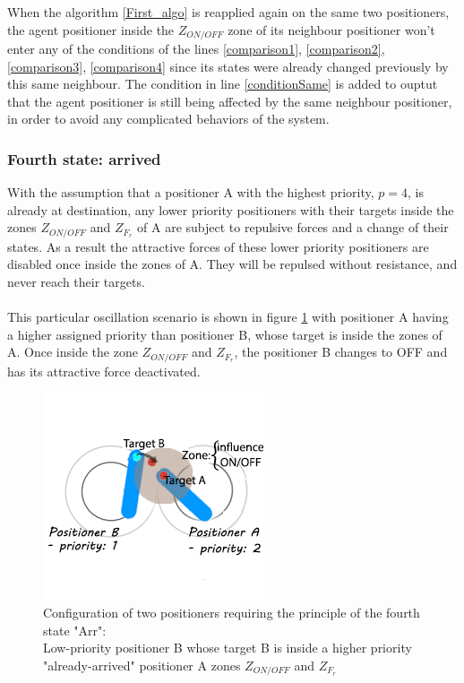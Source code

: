 \documentclass[]{spie}  %
\begin{document}
	When the algorithm \ref{First_algo} is reapplied again on the same two positioners, the agent positioner inside the $Z_{ON/OFF}$ zone of its neighbour positioner won't enter any of the conditions of the lines \ref{comparison1}, \ref{comparison2}, \ref{comparison3}, \ref{comparison4}  since its states were already changed previously by this same neighbour. The condition in line \ref{conditionSame} is added to ouptut that the agent positioner is still being affected by the same neighbour positioner, in order to avoid any complicated behaviors of the system.  

	
	\subsubsection{Fourth state: arrived}
	\label{sub_chap_fourth_state}
	With the assumption that a positioner A with the highest priority, $p = 4$, is already at destination, any lower priority positioners with their targets inside the zones $Z_{ON/OFF}$ and $Z_{F_{r}}$ of A are subject to repulsive forces and a change of their states. As a result the attractive forces of these lower priority positioners are disabled once inside the zones of A. They will be repulsed without resistance, and never reach their targets.\\
	\\
	This particular oscillation scenario is shown in figure \ref{fourth_state} with positioner A having a higher assigned priority than positioner B, whose target is inside the zones of A. Once inside the zone $Z_{ON/OFF}$ and $Z_{F_{r}}$, the positioner B changes to OFF and has its attractive force deactivated.
	\begin{figure}[H]
		\centering
		\includegraphics[scale=1]{images/fourth_state.jpg}
		\caption{\centering	Configuration of two positioners requiring the principle of the fourth state "Arr":\\
		Low-priority positioner B whose target B is inside a higher priority "already-arrived" positioner A zones $Z_{ON/OFF}$ and $Z_{F_{r}}$ }
		\label{fourth_state}
	\end{figure}
\end{document}
